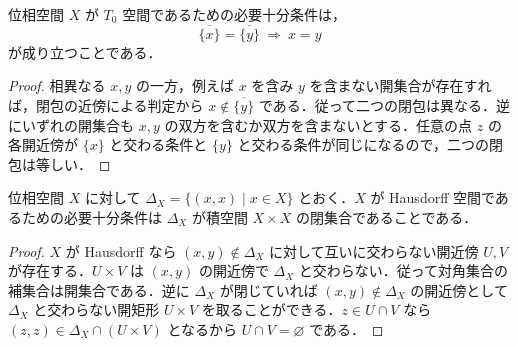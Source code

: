 \begin{prop}[T0空間の特徴づけ]
位相空間 $X$ が $T_0$ 空間であるための必要十分条件は，
\[
 \overline{\{x\}}=\overline{\{y\}}\ \Longrightarrow\ x=y
\]
が成り立つことである．
\end{prop}
\begin{proof}
相異なる $x,y$ の一方，例えば $x$ を含み $y$ を含まない開集合が存在すれば，閉包の近傍による判定から $x\notin\overline{\{y\}}$ である．従って二つの閉包は異なる．逆にいずれの開集合も $x,y$ の双方を含むか双方を含まないとする．任意の点 $z$ の各開近傍が $\{x\}$ と交わる条件と $\{y\}$ と交わる条件が同じになるので，二つの閉包は等しい．
\end{proof}
\begin{thm}[Hausdorff空間と対角集合]
位相空間 $X$ に対して $\Delta_X=\{(x,x)\mid x\in X\}$ とおく．$X$ が Hausdorff 空間であるための必要十分条件は $\Delta_X$ が積空間 $X\times X$ の閉集合であることである．
\end{thm}
\begin{proof}
$X$ が Hausdorff なら $(x,y)\notin\Delta_X$ に対して互いに交わらない開近傍 $U,V$ が存在する．$U\times V$ は $(x,y)$ の開近傍で $\Delta_X$ と交わらない．従って対角集合の補集合は開集合である．逆に $\Delta_X$ が閉じていれば $(x,y)\notin\Delta_X$ の開近傍として $\Delta_X$ と交わらない開矩形 $U\times V$ を取ることができる．$z\in U\cap V$ なら $(z,z)\in\Delta_X\cap(U\times V)$ となるから $U\cap V=\varnothing$ である．
\end{proof}
